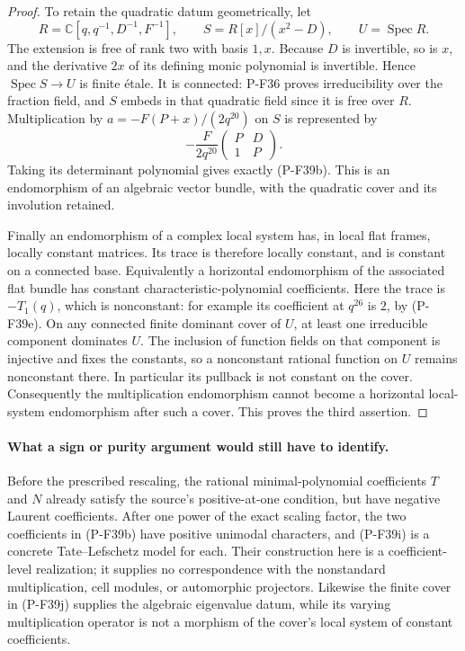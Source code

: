 \begin{proof}
To retain the quadratic datum geometrically, let
\[
 R=\mathbb C[q,q^{-1},D^{-1},F^{-1}],\qquad
 S=R[x]/(x^2-D),\qquad U=\operatorname{Spec}R.
\]
The extension is free of rank two with basis $1,x$.
Because $D$ is invertible, so is $x$, and the derivative
$2x$ of its defining monic polynomial is invertible.
Hence $\operatorname{Spec}S\to U$ is finite \'{e}tale.
It is connected: P-F36 proves irreducibility over the
fraction field, and $S$ embeds in that quadratic field
since it is free over $R$.
Multiplication by $a=-F(P+x)/(2q^{20})$ on $S$ is represented by
\[
 -\frac{F}{2q^{20}}
   \begin{pmatrix}P&D\\1&P\end{pmatrix}.
 \tag{P-F39j}
\]
Taking its determinant polynomial gives exactly (P-F39b).
This is an endomorphism of an algebraic vector bundle,
with the quadratic cover and its involution retained.

Finally an endomorphism of a complex local system has,
in local flat frames, locally constant matrices. Its trace
is therefore locally constant, and is constant on a connected
base. Equivalently a horizontal endomorphism of the associated
flat bundle has constant characteristic-polynomial coefficients.
Here the trace is $-T_1(q)$, which is nonconstant: for example
its coefficient at $q^{26}$ is $2$, by (P-F39e).
On any connected finite dominant cover of $U$, at least one
irreducible component dominates $U$. The inclusion of function
fields on that component is injective and fixes the constants,
so a nonconstant rational function on $U$ remains nonconstant
there. In particular its pullback is not constant on the cover.
Consequently the multiplication endomorphism cannot become
a horizontal local-system endomorphism after such a cover.
This proves the third assertion.
\end{proof}

\paragraph{What a sign or purity argument would still have to identify.}
Before the prescribed rescaling, the rational minimal-polynomial
coefficients $T$ and $N$ already satisfy the source's positive-at-one
condition, but have negative Laurent coefficients. After one power
of the exact scaling factor, the two coefficients in (P-F39b)
have positive unimodal characters, and (P-F39i) is a concrete
Tate--Lefschetz model for each. Their construction here is a
coefficient-level realization; it supplies no correspondence
with the nonstandard multiplication, cell modules, or automorphic
projectors. Likewise the finite cover in (P-F39j) supplies the
algebraic eigenvalue datum, while its varying multiplication
operator is not a morphism of the cover's local system of
constant coefficients.

